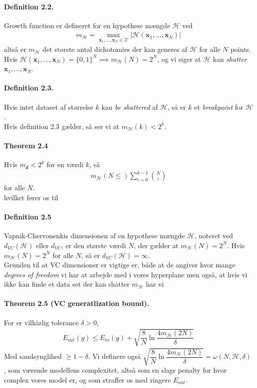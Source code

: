 \documentclass[paper=a4, fontsize=11pt]{scrartcl} %
\numberwithin{equation}{section} %
\numberwithin{figure}{section} %
\numberwithin{table}{section} %
\begin{document}
	\paragraph{\textbf{Definition 2.2}.} Growth function er defineret for en hypothese mængde $\mathcal{H}$ ved
	\begin{align*}
	m_\mathcal{H}=\underset{\mathbf{x}_1,...,\mathbf{x}_N\in\mathcal{X}}{\max}|\mathcal{H}(\mathbf{x}_1,...,\mathbf{x}_N)|
	\end{align*}
	altså er $m_\mathcal{H}$ det største antal dichotomies der kan generes af $\mathcal{H}$ for alle $N$ points. Hvis $\mathcal{H}(\mathbf{x}_1,...,\mathbf{x}_N)=\{0,1\}^N \implies m_\mathcal{H}(N)=2^N$, og vi siger at $\mathcal{H}$ kan \textit{shatter} $\mathbf{x}_1,...,\mathbf{x}_N$.
	\paragraph{\textbf{Definition 2.3}.} Hvis intet dataset af størrelse $k$ kan \textit{be shattered} af $\mathcal{H}$, så er $k$ et \textit{breakpoint} for $\mathcal{H}$. \\
	
	Hvis definition 2.3 gælder, så ser vi at $m_\mathcal{H}(k)<2^k$.
	\paragraph{\textbf{Theorem 2.4}} Hvis $m_\mathcal{k}<2^k$ for en værdi $k$, så
	\begin{align*}
	m_\mathcal{H}(N\leq)\sum_{i=0}^{k-1} {{N}\choose{i}}
	\end{align*}
	for alle $N$. \\
	
	hvilket fører os til  
	\paragraph{\textbf{Definition 2.5}} Vapnik-Chervonenkis dimensionen af en hypothese mængde $\mathcal{H}$, noteret ved $d_{VC}(\mathcal{H})$ eller $d_{VC}$, er den største værdi $N$, der gælder at $m_{\mathcal{H}}(N)=2^N$. Hvis $m_\mathcal{H}(N)=2^N$ for alle $N$, så er $d_{VC}(\mathcal{H})=\infty$. \\
	
	Grunden til at VC dimensioner er vigtige er, både at de angiver hvor mange \textit{degrees of freedom} vi har at arbejde med i vores hyperplane men også, at hvis vi ikke kan finde et data set der kan shatter $m_\mathcal{H}$ har vi
	\paragraph{\textbf{Theorem 2.5} (VC generatlization bound).} For er vilkårlig tolerance $\delta>0$,
	\begin{align*}
	E_{out}(g)\leq E_{in}(g)+\sqrt{\dfrac{8}{N}\ln\dfrac{4m_\mathcal{H}(2N)}{\delta}}
	\end{align*}
	Med sandsynglihed $\geq 1-\delta$. Vi definere også $\sqrt{\dfrac{8}{N}\ln\dfrac{4m_\mathcal{H}(2N)}{\delta}}=\omega(N,\mathcal{H},\delta)$, som værende modellens complexitet, altså som en slags penalty for hvor complex vores model er, og som straffer os med ringere $E_{out}$. \\
	
\end{document}
